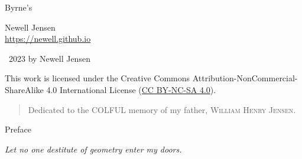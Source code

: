 \documentclass[twoside,11pt]{report}
\begin{document}
\onehalfspacing

\pagecolor{background}
\thispagestyle{empty}

\hfill

\hfill

\hfill

\begin{flushright}
  \LARGE{Byrne's}\\
  \Huge{\color{cred}{E}\color{cblue}{u}\color{cyellow}{c}\color{cred}{l}\color{cblue}{i}\color{cyellow}{d}}
\end{flushright}

\vspace*{\fill}
\newpage

\thispagestyle{empty}

Newell Jensen\\
\url{https://newell.github.io}
\vspace*{\fill}

\large{\textcopyright\ 2023 by Newell Jensen}

\hfill

\hfill

\centerline{\ccbyncsa}

\begin{center}
  \large{This work is licensed under the Creative Commons Attribution-NonCommercial-ShareAlike 4.0 International License (\href{https://creativecommons.org/licenses/by-nc-sa/4.0/}{CC BY-NC-SA 4.0}).}
\end{center}
\vspace*{\fill}
\newpage

\thispagestyle{empty}

\vspace*{\fill}
\begin{quote}
  \centering
  \Large{Dedicated to the \textsc{COL{\color{cred}{O}}{\color{cblue}{U}}{\color{cyellow}{R}}FUL} memory of my father, \LARGE{\textsc{William Henry Jensen}}.}\\
\end{quote}
\vspace*{\fill}
\newpage

\centerline{\LARGE{Preface}}

\hfill

\normalsize %


\hspace{2em}\textit{Let no one destitute of geometry enter my doors.}
\end{document}
